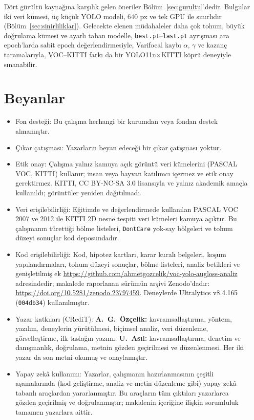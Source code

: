 \documentclass[pdflatex,iicol,sn-mathphys-num]{sn-jnl}
\begin{document}
Dört gürültü kaynağına karşılık gelen öneriler Bölüm~\ref{sec:gurultu}'dedir. Bulgular iki veri kümesi, üç küçük YOLO modeli, 640 px ve tek GPU ile sınırlıdır (Bölüm~\ref{sec:sinirliliklar}). Gelecekte elenen müdahaleler daha çok tohum, büyük doğrulama kümesi ve ayarlı taban modelle, \texttt{best.pt}--\texttt{last.pt} ayrışması ara epoch'larda sabit epoch değerlendirmesiyle, Varifocal kaybı $\alpha$, $\gamma$ ve kazanç taramalarıyla, VOC--KITTI farkı da bir YOLO11n$\times$KITTI köprü deneyiyle sınanabilir.

\backmatter

\section*{Beyanlar}
\begin{itemize}
\item Fon desteği: Bu çalışma herhangi bir kurumdan veya fondan destek almamıştır.
\item Çıkar çatışması: Yazarların beyan edeceği bir çıkar çatışması yoktur.
\item Etik onay: Çalışma yalnız kamuya açık görüntü veri kümelerini (PASCAL VOC, KITTI) kullanır; insan veya hayvan katılımcı içermez ve etik onay gerektirmez. KITTI, CC BY-NC-SA 3.0 lisansıyla ve yalnız akademik amaçla kullanıldı; görüntüler yeniden dağıtılmadı.
\item Veri erişilebilirliği: Eğitimde ve değerlendirmede kullanılan PASCAL VOC 2007 ve 2012 ile KITTI 2D nesne tespiti veri kümeleri kamuya açıktır. Bu çalışmanın türettiği bölme listeleri, \texttt{DontCare} yok-say bölgeleri ve tohum düzeyi sonuçlar kod deposundadır.
\item Kod erişilebilirliği: Kod, hipotez kartları, karar kuralı belgeleri, koşum yapılandırmaları, tohum düzeyi sonuçlar, bölme listeleri, analiz betikleri ve genişletilmiş ek \url{https://github.com/ahmetgozcelik/voc-yolo-augloss-analiz} adresindedir; makalede raporlanan sürümün arşivi Zenodo'dadır: \url{https://doi.org/10.5281/zenodo.23797459}. Deneylerde Ultralytics v8.4.165 (\texttt{004db34}) kullanılmıştır.
\item Yazar katkıları (CRediT): \textbf{A.~G.~Özçelik:} kavramsallaştırma, yöntem, yazılım, deneylerin yürütülmesi, biçimsel analiz, veri düzenleme, görselleştirme, ilk taslağın yazımı. \textbf{U.~Asıl:} kavramsallaştırma, denetim ve danışmanlık, doğrulama, metnin gözden geçirilmesi ve düzenlenmesi. Her iki yazar da son metni okumuş ve onaylamıştır.
\item Yapay zekâ kullanımı: Yazarlar, çalışmanın hazırlanmasının çeşitli aşamalarında (kod geliştirme, analiz ve metin düzenleme gibi) yapay zekâ tabanlı araçlardan yararlanmıştır. Bu araçların tüm çıktıları yazarlarca gözden geçirilmiş ve doğrulanmıştır; makalenin içeriğine ilişkin sorumluluk tamamen yazarlara aittir.
\end{itemize}

\begin{appendices}

\end{appendices}


\end{document}
